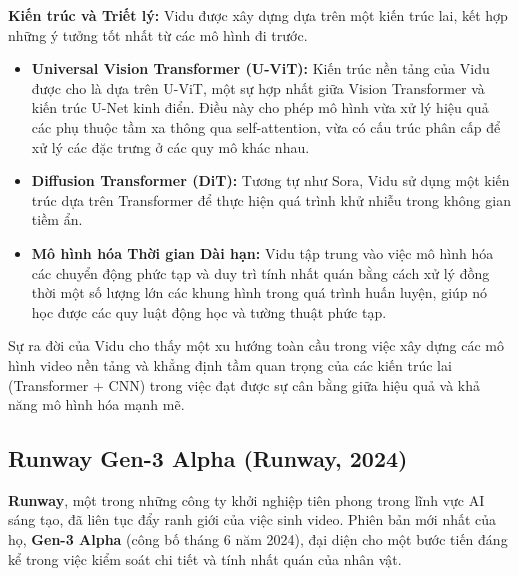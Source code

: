 \textbf{Kiến trúc và Triết lý:}
Vidu được xây dựng dựa trên một kiến trúc lai, kết hợp những ý tưởng tốt nhất từ các mô hình đi trước.
\begin{itemize}
	\item \textbf{Universal Vision Transformer (U-ViT):} Kiến trúc nền tảng của Vidu được cho là dựa trên U-ViT, một sự hợp nhất giữa Vision Transformer và kiến trúc U-Net kinh điển. Điều này cho phép mô hình vừa xử lý hiệu quả các phụ thuộc tầm xa thông qua self-attention, vừa có cấu trúc phân cấp để xử lý các đặc trưng ở các quy mô khác nhau.
	\item \textbf{Diffusion Transformer (DiT):} Tương tự như Sora, Vidu sử dụng một kiến trúc dựa trên Transformer để thực hiện quá trình khử nhiễu trong không gian tiềm ẩn.
	\item \textbf{Mô hình hóa Thời gian Dài hạn:} Vidu tập trung vào việc mô hình hóa các chuyển động phức tạp và duy trì tính nhất quán bằng cách xử lý đồng thời một số lượng lớn các khung hình trong quá trình huấn luyện, giúp nó học được các quy luật động học và tường thuật phức tạp.
\end{itemize}
Sự ra đời của Vidu cho thấy một xu hướng toàn cầu trong việc xây dựng các mô hình video nền tảng và khẳng định tầm quan trọng của các kiến trúc lai (Transformer + CNN) trong việc đạt được sự cân bằng giữa hiệu quả và khả năng mô hình hóa mạnh mẽ.

\subsection{Runway Gen-3 Alpha (Runway, 2024)}
\label{subsec:runway_gen3}
\textbf{Runway}, một trong những công ty khởi nghiệp tiên phong trong lĩnh vực AI sáng tạo, đã liên tục đẩy ranh giới của việc sinh video. Phiên bản mới nhất của họ, \textbf{Gen-3 Alpha} (công bố tháng 6 năm 2024), đại diện cho một bước tiến đáng kể trong việc kiểm soát chi tiết và tính nhất quán của nhân vật.

